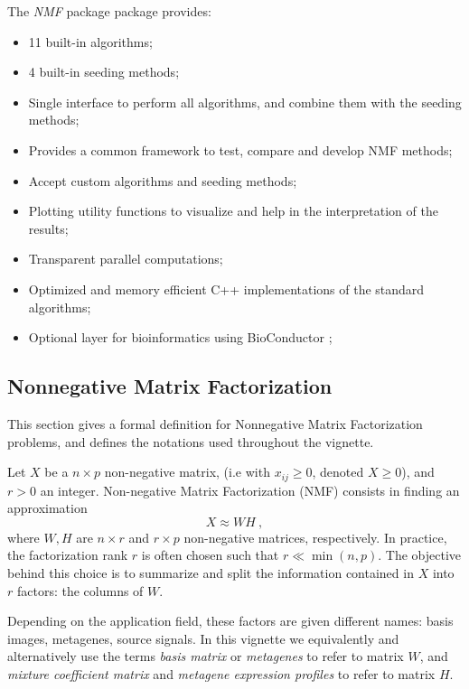 \documentclass[a4paper]{article}\usepackage[]{graphicx}\usepackage[]{color}
\newcommand{\pkgname}[1]{\textit{#1}\xspace}
\newcommand{\Rpkg}[1]{\pkgname{#1} package\xspace}
\newcommand{\nmfpack}{\Rpkg{NMF}}
\renewcommand{\cite}[1]{\parencite{#1}}
\begin{document}
The \nmfpack package provides:
\begin{itemize}
\item 11 built-in algorithms;
\item 4 built-in seeding methods;
\item Single interface to perform all algorithms, and combine them with the seeding methods;
\item Provides a common framework to test, compare and develop NMF methods;
\item Accept custom algorithms and seeding methods;
\item Plotting utility functions to visualize and help in the interpretation of the results;
\item Transparent parallel computations;
\item Optimized and memory efficient C++ implementations of the standard algorithms;
\item Optional layer for bioinformatics using BioConductor \cite{Gentleman2004};
\end{itemize}

\subsection{Nonnegative Matrix Factorization}

This section gives a formal definition for Nonnegative Matrix Factorization problems, and defines the notations used throughout the vignette. 

Let $X$ be a $n \times p$ non-negative matrix, (i.e with $x_{ij} \geq 0$,
denoted $X \geq 0$), and $r > 0$ an integer. Non-negative Matrix Factorization (NMF) consists in finding an approximation
\begin{equation}
X \approx W H\ , \label{NMFstd}
\end{equation}
where $W, H$ are $n\times r$ and $r \times p$ non-negative matrices, respectively. 
In practice, the factorization rank $r$ is often chosen such that $r \ll \min(n, p)$. 
The objective behind this choice is to summarize and split the information contained in $X$ into $r$ factors: the columns of $W$. 

Depending on the application field, these factors are given different names: basis images, metagenes, source signals. In this vignette we equivalently and alternatively use the terms 
\emph{basis matrix} or \emph{metagenes} to refer to matrix $W$, and \emph{mixture coefficient matrix} and \emph{metagene expression profiles} to refer to matrix $H$.
\end{document}
